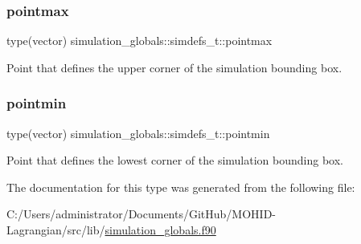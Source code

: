 \mbox{\label{structsimulation__globals_1_1simdefs__t_a8c7a365078a69252312ea200c619bcb6}} 
\subsubsection{\texorpdfstring{pointmax}{pointmax}}
{\footnotesize\ttfamily type(vector) simulation\+\_\+globals\+::simdefs\+\_\+t\+::pointmax\hspace{0.3cm}{\ttfamily [private]}}



Point that defines the upper corner of the simulation bounding box. 

\mbox{\label{structsimulation__globals_1_1simdefs__t_a76b66c4e9d305de6a0c3b8f1bd2ef319}} 
\subsubsection{\texorpdfstring{pointmin}{pointmin}}
{\footnotesize\ttfamily type(vector) simulation\+\_\+globals\+::simdefs\+\_\+t\+::pointmin\hspace{0.3cm}{\ttfamily [private]}}



Point that defines the lowest corner of the simulation bounding box. 



The documentation for this type was generated from the following file\+:\begin{DoxyCompactItemize}
\item 
C\+:/\+Users/administrator/\+Documents/\+Git\+Hub/\+M\+O\+H\+I\+D-\/\+Lagrangian/src/lib/\mbox{\hyperlink{simulation__globals_8f90}{simulation\+\_\+globals.\+f90}}\end{DoxyCompactItemize}
